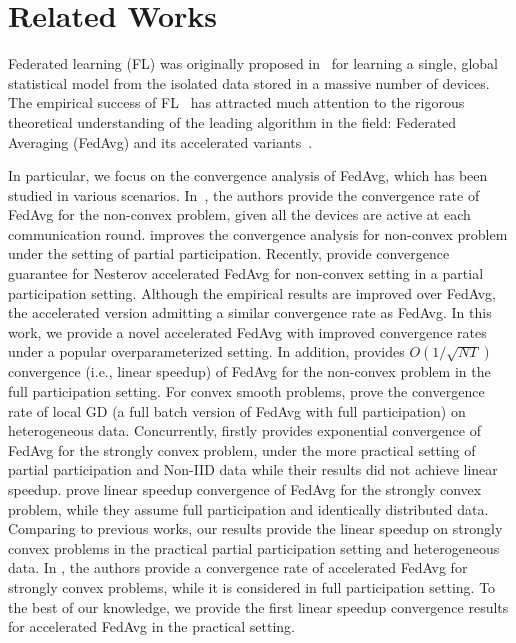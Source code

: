 
\section{Related Works}

Federated learning (FL) was originally proposed
in~\cite{mcmahan2016communication} for learning a single, global statistical
model from the isolated data stored in a massive number of devices.  The
empirical success of FL~\cite{chen2018federated,47586} has attracted much attention to the rigorous theoretical understanding of the leading algorithm in the field: Federated Averaging (FedAvg) and its accelerated variants~\cite{liu2019accelerating,haddadpour2019convergence,khaled2019first,li2019convergence,huo2020faster,yu2019linear,yu2019parallel}.

In particular, we focus on the convergence analysis of FedAvg, which
has been studied in various scenarios. 
In~\cite{yu2019parallel,wang2019adaptive}, the authors provide the convergence rate of FedAvg for the non-convex problem, given all the devices are active at each communication round. \cite{haddadpour2019convergence}
improves the convergence analysis for non-convex problem under the setting of partial participation. 
Recently, \citep{huo2020faster} provide
convergence guarantee for Nesterov accelerated FedAvg for non-convex 
setting in a partial participation setting. Although the empirical
results are improved over FedAvg, the accelerated version admitting a similar convergence rate as FedAvg. In this work, we provide a novel accelerated
FedAvg with improved convergence rates under a popular overparameterized setting. In addition, \cite{yu2019linear} provides $O(1/\sqrt{NT})$ 
convergence (i.e., linear speedup) of FedAvg for the non-convex problem in the full participation setting. 
For convex smooth problems, \cite{khaled2019first} prove the 
convergence rate of local GD (a full batch version of FedAvg with full participation) on heterogeneous data. 
Concurrently, \cite{li2019convergence} firstly provides exponential convergence of FedAvg for the strongly convex problem,
under the more practical setting of partial participation and Non-IID data while their results did not achieve linear speedup. 
\cite{stich2018local} prove linear speedup convergence of FedAvg for the strongly convex problem, while they assume full participation and identically distributed data. Comparing to previous works, our results provide the linear speedup on strongly convex problems in the practical partial participation setting and heterogeneous data. In \cite{liu2019accelerating}, the authors provide a convergence rate of accelerated FedAvg for strongly convex problems, while it is considered in full participation setting. To the best of our knowledge,
we provide the first linear speedup convergence results for accelerated FedAvg in the practical setting.









